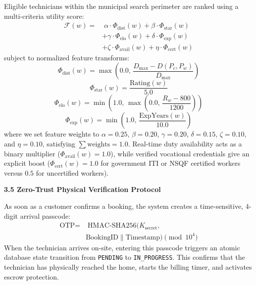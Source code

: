 \documentclass[10pt,twocolumn,a4paper]{article}
\begin{document}
Eligible technicians within the municipal search perimeter are ranked using a multi-criteria utility score:
\begin{equation}
\begin{aligned}
\mathcal{F}(w) = &\; \alpha \cdot \Phi_{\text{dist}}(w) + \beta \cdot \Phi_{\text{star}}(w) \\
& + \gamma \cdot \Phi_{\text{elo}}(w) + \delta \cdot \Phi_{\text{exp}}(w) \\
& + \zeta \cdot \Phi_{\text{avail}}(w) + \eta \cdot \Phi_{\text{cert}}(w)
\end{aligned}
\end{equation}
subject to normalized feature transforms:
\begin{equation}
\Phi_{\text{dist}}(w) = \max\left(0.0, \, \frac{D_{\max} - D(P_c, P_w)}{D_{\max}}\right)
\end{equation}
\begin{equation}
\Phi_{\text{star}}(w) = \frac{\text{Rating}(w)}{5.0}
\end{equation}
\begin{equation}
\Phi_{\text{elo}}(w) = \min\left(1.0, \, \max\left(0.0, \, \frac{R_w - 800}{1200}\right)\right)
\end{equation}
\begin{equation}
\Phi_{\text{exp}}(w) = \min\left(1.0, \, \frac{\text{ExpYears}(w)}{10.0}\right)
\end{equation}
where we set feature weights to $\alpha = 0.25$, $\beta = 0.20$, $\gamma = 0.20$, $\delta = 0.15$, $\zeta = 0.10$, and $\eta = 0.10$, satisfying $\sum \text{weights} = 1.0$. Real-time duty availability acts as a binary multiplier ($\Phi_{\text{avail}}(w) = 1.0$), while verified vocational credentials give an explicit boost ($\Phi_{\text{cert}}(w) = 1.0$ for government ITI or NSQF certified workers versus $0.5$ for uncertified workers).

\vspace{0.8em}
\noindent
\textbf{3.5 Zero-Trust Physical Verification Protocol}

As soon as a customer confirms a booking, the system creates a time-sensitive, 4-digit arrival passcode:
\begin{equation}
\begin{aligned}
\text{OTP} = &\; \text{HMAC-SHA256}(K_{\text{secret}}, \\
& \text{BookingID} \parallel \text{Timestamp}) \pmod{10^4}
\end{aligned}
\end{equation}
When the technician arrives on-site, entering this passcode triggers an atomic database state transition from \texttt{PENDING} to \texttt{IN\_PROGRESS}. This confirms that the technician has physically reached the home, starts the billing timer, and activates escrow protection.
\end{document}
